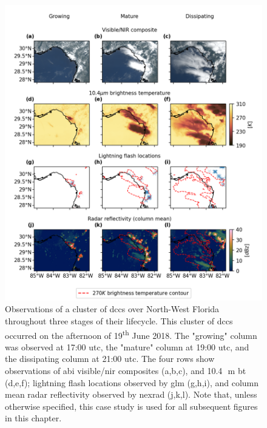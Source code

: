 \begin{figure}[tp]
    \includegraphics[width=\textwidth]{figures/chapter1_01.png}
    \caption[
    Observations of a cluster of \acrshort{dcc}s over North-West Florida throughout three stages of their lifecycle
    ]{
    Observations of a cluster of \acrshort{dcc}s over North-West Florida throughout three stages of their lifecycle. This cluster of \acrshort{dcc}s occurred on the afternoon of 19\textsuperscript{th} June 2018. The "growing" column was observed at 17:00 \acrshort{utc}, the "mature" column at 19:00 \acrshort{utc}, and the dissipating column at 21:00 \acrshort{utc}. The four rows show observations of \acrshort{abi} visible/\acrshort{nir} composites (a,b,c), and 10.4\,\unit{\mu m} \acrshort{bt} (d,e,f); lightning flash locations observed by \acrshort{glm} (g,h,i), and column mean radar reflectivity observed by \acrshort{nexrad} (j,k,l). Note that, unless otherwise specified, this case study is used for all subsequent figures in this chapter.
    }
    \label{fig:compare_sat_radar_glm}
\end{figure}


